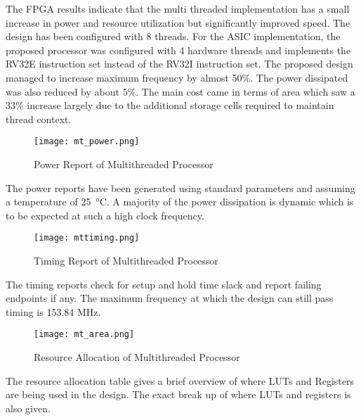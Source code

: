 \documentclass[conference]{IEEEtran}
\begin{document}
The FPGA results indicate that the multi threaded implementation has a small increase in power and resource utilization but significantly improved speed. The design has been configured with 8 threads.
\newline
\newline
For the ASIC implementation, the proposed processor was configured with 4 hardware threads and implements the RV32E instruction set instead of the RV32I instruction set. The proposed design managed to increase maximum frequency by almost 50\%. The power dissipated was also reduced by about 5\%. The main cost came in terms of area which saw a 33\% increase largely due to the additional storage cells required to maintain thread context.

\begin{figure}[H]
    \centering
    \texttt{[image: mt\_power.png]}  %
    \caption{Power Report of Multithreaded Processor}  %
    \label{fig:mt_power}  %
\end{figure}

The power reports have been generated using standard parameters and assuming a temperature of \SI{25}{\celsius}. A majority of the power dissipation is dynamic which is to be expected at such a high clock frequency.

\begin{figure}[H]
    \centering
    \texttt{[image: mttiming.png]}  %
    \caption{Timing Report of Multithreaded Processor}  %
    \label{fig:mttiming}  %
\end{figure}

The timing reports check for setup and hold time slack and report failing endpoints if any. The maximum frequency at which the design can still pass timing is 153.84 MHz.

\begin{figure}[H]
    \centering
    \texttt{[image: mt\_area.png]}  %
    \caption{Resource Allocation of Multithreaded Processor}  %
    \label{fig:mt_area}  %
\end{figure}

The resource allocation table gives a brief overview of where LUTs and Registers are being used in the design. The exact break up of where LUTs and registers is also given.
\end{document}
